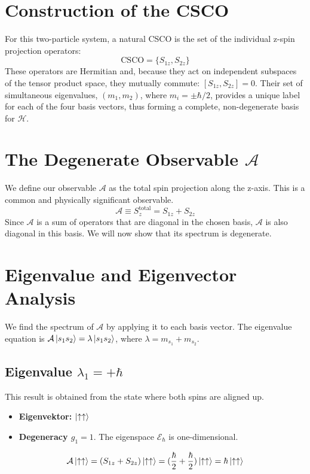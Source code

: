 \documentclass[11pt,a4paper]{article}
\begin{document}
\section{Construction of the CSCO}

For this two-particle system, a natural CSCO is the set of the individual z-spin projection operators:
\begin{equation}
    \text{CSCO} = \{ S_{1z}, S_{2z} \}
\end{equation}
These operators are Hermitian and, because they act on independent subspaces of the tensor product space, they mutually commute: $[S_{1z}, S_{2z}] = 0$. Their set of simultaneous eigenvalues, $(m_1, m_2)$, where $m_i = \pm \hbar/2$, provides a unique label for each of the four basis vectors, thus forming a complete, non-degenerate basis for $\mathcal{H}$.

\section{The Degenerate Observable $\mathcal{A}$}

We define our observable $\mathcal{A}$ as the total spin projection along the z-axis. This is a common and physically significant observable.
\begin{equation}
    \mathcal{A} \equiv S_{z}^{\text{total}} = S_{1z} + S_{2z}
\end{equation}
Since $\mathcal{A}$ is a sum of operators that are diagonal in the chosen basis, $\mathcal{A}$ is also diagonal in this basis. We will now show that its spectrum is degenerate.

\section{Eigenvalue and Eigenvector Analysis}

We find the spectrum of $\mathcal{A}$ by applying it to each basis vector. The eigenvalue equation is $\mathcal{A}\ket{s_1 s_2} = \lambda \ket{s_1 s_2}$, where $\lambda = m_{s_1} + m_{s_2}$.

\subsection{Eigenvalue $\lambda_1 = +\hbar$}
This result is obtained from the state where both spins are aligned up.
\begin{itemize}
    \item \textbf{Eigenvektor:} $\ket{\uparrow\uparrow}$
    \item \textbf{Degeneracy $g_1=1$}. The eigenspace $\mathcal{E}_{\hbar}$ is one-dimensional.
\end{itemize}
\begin{equation}
    \mathcal{A}\ket{\uparrow\uparrow} = (S_{1z} + S_{2z})\ket{\uparrow\uparrow} = (\frac{\hbar}{2} + \frac{\hbar}{2})\ket{\uparrow\uparrow} = \hbar\ket{\uparrow\uparrow}
\end{equation}
\end{document}
